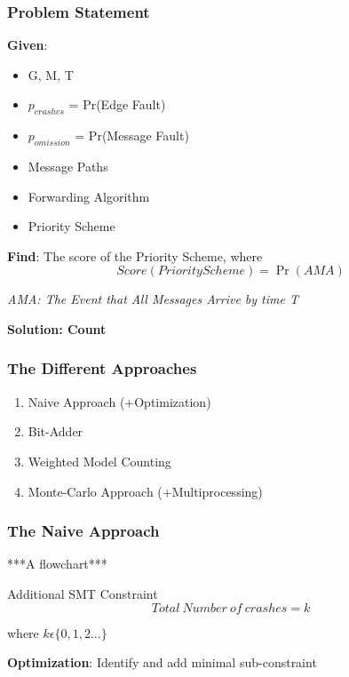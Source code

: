 \documentclass{beamer}
\begin{document}
\begin{frame}
\frametitle{Problem Statement}
	\textbf{Given}:
	\begin{itemize}
		\item G, M, T
		\item $p_{crashes}$ = Pr(Edge Fault)
		\item $p_{omission}$ = Pr(Message Fault)
		\item Message Paths
		\item Forwarding Algorithm
		\item Priority Scheme\\[1ex]
	\end{itemize}
	\textbf{Find}:
	The score of the Priority Scheme, where
	\begin{equation}
		Score(Priority Scheme) = \Pr(AMA)
	\end{equation}
	\begin{flushright}
		\textit{AMA: The Event that All Messages Arrive by time T}
	\end{flushright}
	\textbf{Solution: Count}
\end{frame}

\begin{frame}
\frametitle{The Different Approaches}
\begin{enumerate}
\item Naive Approach (+Optimization)
\item Bit-Adder
\item Weighted Model Counting
\item Monte-Carlo Approach (+Multiprocessing)
\end{enumerate}
\end{frame}

\begin{frame}
\frametitle{The Naive Approach}
	***A flowchart***\\[3ex]
	\pause
	\begin{block}{Additional SMT Constraint}
	\begin{equation}
		Total\ Number\ of\ crashes = k
	\end{equation} 
	\begin{flushright}
		where $k\epsilon\{0,1,2...\}$
	\end{flushright}
	\end{block}
	\pause
	\textbf{Optimization}: 
	Identify and add minimal sub-constraint
\end{frame}
\end{document}
